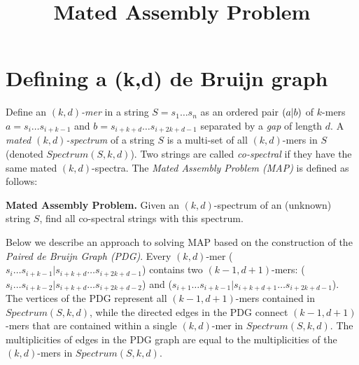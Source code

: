 \section{Defining a (k,d) de Bruijn graph}


\newcommand{\abruijn}{\ensuremath{\mathcal{A}}-Bruijn}
\newcommand{\matching}{\ensuremath{\mathcal{S}}}
\newcommand{\msa}{\ensuremath{\mathcal{G}}}
\newtheorem{defn}{Definition}[section]
\newcommand{\ul}[1]{\underline{#1}}
\long{}

\newsavebox{\savepar}
\newenvironment{algorithm}[1][]
{\begin{lrbox}{\savepar}\begin{minipage}{6in}
\begin{center}\textbf{#1} \end{center} }
{\end{minipage}\end{lrbox}\fbox{\usebox{\savepar}}}


\title{Mated Assembly Problem}
\date{}
\maketitle

Define an \textit{$(k,d)$-mer} in a string $S=s_1 \ldots s_n$ as an
ordered pair $(a | b)$ of $k$-mers $a = s_i \ldots s_{i+k-1}$ and $b = s_{i+k+d} \ldots
s_{i+2k+d-1}$ separated by a {\em gap} of length $d$. A {\em mated
  $(k,d)$-spectrum} of a string $S$ is a multi-set of all $(k,d)$-mers
in $S$ (denoted $Spectrum(S,k,d)$).  Two strings are called {\em
  co-spectral} if they have the same mated $(k,d)$-spectra. The {\em
  Mated Assembly Problem (MAP)} is defined as follows:

\textbf{Mated Assembly Problem.}  Given an $(k,d)$-spectrum  of an (unknown) string $S$,
find all co-spectral strings with this spectrum. 

Below we describe an approach to solving MAP based on the construction
of the \textit{Paired de Bruijn Graph (PDG)}.  Every $(k,d)$-mer ($s_i
\ldots s_{i+k-1}|s_{i+k+d} \ldots s_{i+2k+d-1}$) contains two
$(k-1,d+1)$-mers: ($s_i \ldots s_{i+k-2}|s_{i+k+d} \ldots
s_{i+2k+d-2}$) and ($s_{i+1} \ldots s_{i+k-1}|s_{i+k+d+1} \ldots
s_{i+2k+d-1}$). The vertices of the PDG represent all $(k-1,d+1)$-mers
contained in $Spectrum(S,k,d)$, while the directed edges in the PDG
connect $(k-1,d+1)$-mers that are contained within a single
$(k,d)$-mer in $Spectrum(S,k,d)$.  The multiplicities of edges in the
PDG graph are equal to the multiplicities of the $(k,d)$-mers in
$Spectrum(S,k,d)$.

